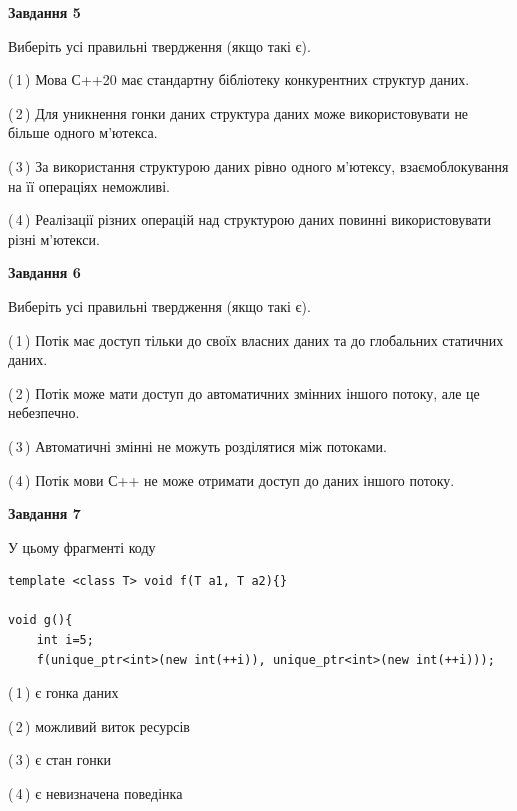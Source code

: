 \documentclass[12pt, ukrainian]{article}
\begin{document}
\begin {large}
{\begin{center}
\textbf{Завдання 5}
\end{center}

Виберіть усі правильні твердження (якщо такі є).\par
\vspace{2mm}

(\,1\,) Мова С++20 має стандартну бібліотеку конкурентних структур даних.%

(\,2\,) Для уникнення гонки даних структура даних може використовувати не більше одного м’ютекса.%

(\,3\,) За використання структурою даних рівно одного м’ютексу, взаємоблокування на її операціях неможливі.%

(\,4\,) Реалізації різних операцій над структурою даних повинні використовувати різні м’ютекси.%
\newpage


\begin{center}
\textbf{Завдання 6}
\end{center}

Виберіть усі правильні твердження (якщо такі є).\par
\vspace{2mm}

(\,1\,) Потік має доступ тільки до своїх власних даних та до глобальних статичних даних.%

(\,2\,) Потік може мати доступ до автоматичних змінних іншого потоку, але це небезпечно.%

(\,3\,) Автоматичні змінні не можуть розділятися між потоками.%

(\,4\,) Потік мови С++ не може отримати доступ до даних іншого потоку.%


\begin{center}
\textbf{Завдання 7}
\end{center}

У цьому фрагменті коду
\begin{verbatim}
template <class T> void f(T a1, T a2){}

void g(){
    int i=5;
    f(unique_ptr<int>(new int(++i)), unique_ptr<int>(new int(++i)));
\end{verbatim}

(\,1\,) є гонка даних%

(\,2\,) можливий виток ресурсів%

(\,3\,) є стан гонки%

(\,4\,) є невизначена поведінка%

}
\end {large}

\vspace{4mm}
\newpage
\end{document}
